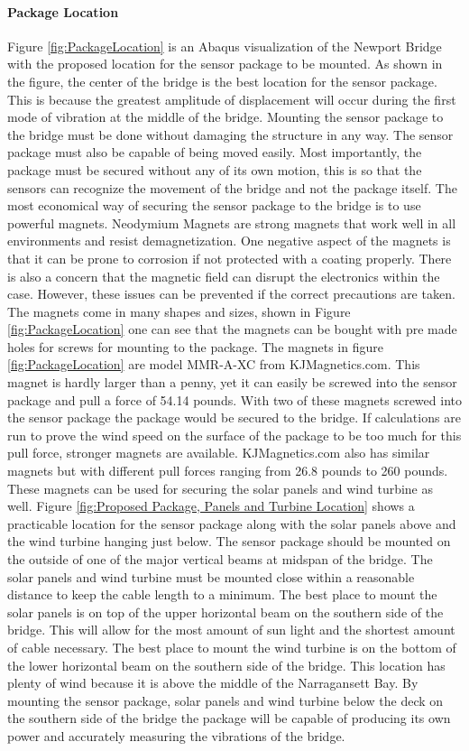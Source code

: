 \paragraph{Package Location}
\indent Figure \ref{fig:PackageLocation} is an Abaqus visualization of the Newport Bridge with the proposed location for the sensor package to be mounted.
As shown in the figure, the center of the bridge is the best location for the sensor package. This is because the greatest amplitude of displacement will
occur during the first mode of vibration at the middle of the bridge. Mounting the sensor package to the bridge must be done without damaging the
structure in any way. The sensor package must also be capable of being moved easily. Most importantly, the package must be secured without any of its
own motion, this is so that the sensors can recognize the movement of the bridge and not the package itself. The most economical way of securing the
sensor package to the bridge is to use powerful magnets. Neodymium Magnets are strong magnets that work well in all environments and resist
demagnetization. One negative aspect of the magnets is that it can be prone to corrosion if not protected with a coating properly. There is also a
concern that the magnetic field can disrupt the electronics within the case. However, these issues can be prevented if the correct precautions are
taken. The magnets come in many shapes and sizes, shown in Figure \ref{fig:PackageLocation} one can see that the magnets can be bought with pre
made holes for screws for mounting to the package. The magnets in figure \ref{fig:PackageLocation} are model MMR-A-XC from KJMagnetics.com. This
magnet is hardly larger than a penny, yet it can easily be screwed into the sensor package and pull a force of 54.14 pounds. With two of these
magnets screwed into the sensor package the package would be secured to the bridge. If calculations are run to prove the wind speed on the
surface of the package to be too much for this pull force, stronger magnets are available. KJMagnetics.com also has similar magnets but with
different pull forces ranging from 26.8 pounds to 260 pounds. These magnets can be used for securing the solar panels and wind turbine as
well. Figure \ref{fig:Proposed Package, Panels and Turbine Location} shows a practicable location for the sensor package along with the solar
panels above and the wind turbine hanging just below. The sensor package should be mounted on the outside of one of the major vertical beams
at midspan of the bridge. The solar panels and wind turbine must be mounted close within a reasonable distance to keep the cable length to
a minimum. The best place to mount the solar panels is on top of the upper horizontal beam on the southern side of the bridge. This will
allow for the most amount of sun light and the shortest amount of cable necessary. The best place to mount the wind turbine is on the
bottom of the lower horizontal beam on the southern side of the bridge. This location has plenty of wind because it is above the middle
of the Narragansett Bay. By mounting the sensor package, solar panels and wind turbine below the deck on the southern side of the
bridge the package will be capable of producing its own power and accurately measuring the vibrations of the bridge.


